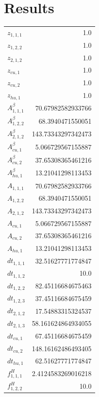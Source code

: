 \documentclass{article}%
\makeatletter
\let\mcnewpage=\newpage%
\newcommand{\TrickSupertabularIntoMulticols}{%
\renewcommand\newpage{%
\if@firstcolumn%
\hrule width\linewidth height0pt%
\columnbreak%
\else%
\mcnewpage%
\fi%
}%
}%
\makeatother
\begin{document}
\section{Results}%
\thispagestyle{plain}%
\begin{multicols*}{3}%
\TrickSupertabularIntoMulticols%
%
\begin{supertabular}{lr}%
	$z_{1,1,1}$ & 1.0 \\%
	$z_{1,2,2}$ & 1.0 \\%
	$z_{2,1,2}$ & 1.0 \\%
	$z_{cu,1}$ & 1.0 \\%
	$z_{cu,2}$ & 1.0 \\%
	$z_{hu,1}$ & 1.0 \\%
	$A_{1,1,1}^{\beta}$ & 70.67982582933766 \\%
	$A_{1,2,2}^{\beta}$ & 68.3940471550051 \\%
	$A_{2,1,2}^{\beta}$ & 143.73343297342473 \\%
	$A_{cu,1}^{\beta}$ & 5.066729567155887 \\%
	$A_{cu,2}^{\beta}$ & 37.65308365461216 \\%
	$A_{hu,1}^{\beta}$ & 13.21041298113453 \\%
	$A_{1,1,1}$ & 70.67982582933766 \\%
	$A_{1,2,2}$ & 68.3940471550051 \\%
	$A_{2,1,2}$ & 143.73343297342473 \\%
	$A_{cu,1}$ & 5.066729567155887 \\%
	$A_{cu,2}$ & 37.65308365461216 \\%
	$A_{hu,1}$ & 13.21041298113453 \\%
	$dt_{1,1,1}$ & 32.51627771774847 \\%
	$dt_{1,1,2}$ & 10.0 \\%
	$dt_{1,2,2}$ & 82.45116684675463 \\%
	$dt_{1,2,3}$ & 37.45116684675459 \\%
	$dt_{2,1,2}$ & 17.54883315324537 \\%
	$dt_{2,1,3}$ & 58.161624864934055 \\%
	$dt_{cu,1}$ & 67.45116684675459 \\%
	$dt_{cu,2}$ & 148.16162486493405 \\%
	$dt_{hu,1}$ & 62.51627771774847 \\%
	$f_{1,1,1}^{H}$ & 2.4124583269016218 \\%
	$f_{1,2,2}^{H}$ & 10.0 \\%

\end{supertabular}
\end{multicols*}
\end{document}
